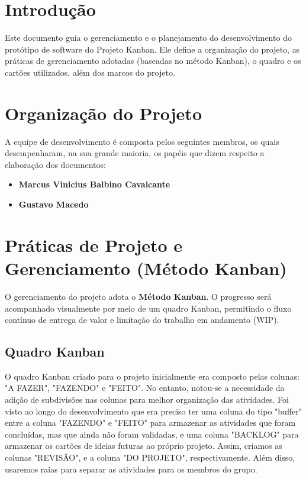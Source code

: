 \section{Introdução}
Este documento guia o gerenciamento e o planejamento do desenvolvimento 
do protótipo de software do Projeto Kanban. Ele define a organização do projeto, 
as práticas de gerenciamento adotadas (baseadas no método Kanban), 
o quadro e os cartões utilizados, além dos marcos do projeto.

\section{Organização do Projeto}
A equipe de desenvolvimento é composta pelos seguintes membros, os quais desempenharam, 
na sua grande maioria, os papéis que dizem respeito a elaboração dos documentos:
\begin{itemize}
    \item \textbf{Marcus Vinicius Balbino Cavalcante}
    \item \textbf{Gustavo Macedo}
\end{itemize}

\section{Práticas de Projeto e Gerenciamento (Método Kanban)}
O gerenciamento do projeto adota o \textbf{Método Kanban}. O progresso 
será acompanhado visualmente por meio de um quadro Kanban, permitindo 
o fluxo contínuo de entrega de valor e limitação do trabalho 
em andamento (WIP).

\subsection{Quadro Kanban}
O quadro Kanban criado para o projeto inicialmente era composto pelas colunas:
"A FAZER", "FAZENDO" e "FEITO". No entanto, notou-se a necessidade da adição de 
subdivisões nas colunas para melhor organização das atividades. Foi visto ao 
longo do desenvolvimento que era preciso ter uma coluna do tipo "buffer" entre 
a coluna "FAZENDO" e "FEITO" para armazenar as atividades que foram concluídas, 
mas que ainda não foram validadas, e uma coluna "BACKLOG" para armazenar os
cartões de ideias futuras ao próprio projeto. Assim, criamos as colunas "REVISÃO", 
e a coluna "DO PROJETO", respectivamente. Além disso, usaremos raias para separar 
as atividades para os membros do grupo.


